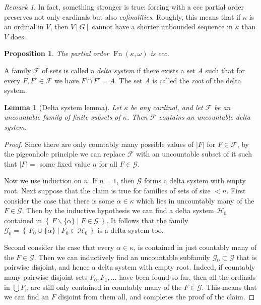 \documentclass[11pt,oneside,a4paper]{amsbook}
\newcommand{\set}[1]{\left\{\,#1\,\right\}}
\DeclareMathOperator{\Fn}{Fn}
\theoremstyle{definition}
\theoremstyle{plain}
\newtheorem{lemma}[theorem]{Lemma}
\newtheorem{proposition}[theorem]{Proposition}
\theoremstyle{definition}
\theoremstyle{remark}
\newtheorem{remark}[theorem]{Remark}
\numberwithin{equation}{section}
\numberwithin{figure}{section}
\begin{document}
\begin{remark}
  In fact, something stronger is true: forcing with a ccc partial order preserves not only cardinals but also \emph{cofinalities}. Roughly, this means that if $\kappa$ is an ordinal in $V$, then $V[G]$ cannot have a shorter unbounded sequence in $\kappa$ than $V$ does.
\end{remark}

\begin{proposition}
  \label{prop:cohen-ccc}
  The partial order $\Fn(\kappa,\omega)$ is ccc.
\end{proposition}

A family $\mathcal F$ of sets is called a \emph{delta system} if there exists a set $A$ such that for every $F,F'\in\mathcal F$ we have $F\cap F'=A$. The set $A$ is called the \emph{root} of the delta system.

\begin{lemma}[Delta system lemma]
  \label{lem:delta-system}
  Let $\kappa$ be any cardinal, and let $\mathcal F$ be an uncountable family of finite subsets of $\kappa$. Then $\mathcal F$ contains an uncountable delta system.
\end{lemma}

\begin{proof}
  Since there are only countably many possible values of $|F|$ for $F\in\mathcal F$, by the pigeonhole principle we can replace $\mathcal F$ with an uncountable subset of it such that $|F|=$ some fixed value $n$ for all $F\in\mathcal G$.

  Now we use induction on $n$. If $n=1$, then $\mathcal G$ forms a delta system with empty root. Next suppose that the claim is true for families of sets of size $<n$. First consider the case that there is some $\alpha\in\kappa$ which lies in uncountably many of the $F\in\mathcal G$. Then by the inductive hypothesis we can find a delta system $\mathcal H_0$ contained in $\set{F\smallsetminus\{\alpha\}\mid F\in\mathcal G}$. It follows that the family $\mathcal G_0=\set{F_0\cup\{\alpha\}\mid F_0\in\mathcal H_0}$ is a delta system too.

  Second consider the case that every $\alpha\in\kappa$, is contained in just countably many of the $F\in\mathcal G$. Then we can inductively find an uncountable subfamily $\mathcal G_0\subset\mathcal G$ that is pairwise disjoint, and hence a delta system with empty root. Indeed, if countably many pairwise disjoint sets $F_0,F_1,\ldots$ have been found so far, then all the ordinals in $\bigcup F_n$ are still only contained in countably many of the $F\in\mathcal G$. This means that we can find an $F$ disjoint from them all, and completes the proof of the claim.
\end{proof}
\end{document}
